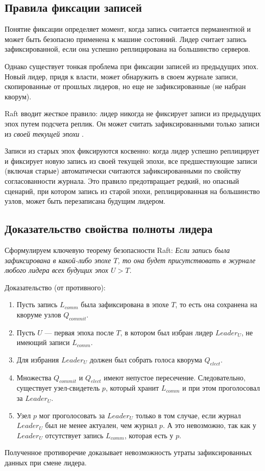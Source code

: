 \subsection{Правила фиксации записей}

Понятие фиксации определяет момент, когда запись считается перманентной и может быть безопасно применена к машине состояний. Лидер считает запись зафиксированной, если она успешно реплицирована на большинство серверов.

Однако существует тонкая проблема при фиксации записей из предыдущих эпох. Новый лидер, придя к власти, может обнаружить в своем журнале записи, скопированные от прошлых лидеров, но еще не зафиксированные (не набран кворум).

Raft вводит жесткое правило: лидер никогда не фиксирует записи из предыдущих эпох путем подсчета реплик. Он может считать зафиксированными только записи из \textit{своей текущей эпохи} \cite{raft_dissertation}.

Записи из старых эпох фиксируются косвенно: когда лидер успешно реплицирует и фиксирует новую запись из своей текущей эпохи, все предшествующие записи (включая старые) автоматически считаются зафиксированными по свойству согласованности журнала.
Это правило предотвращает редкий, но опасный сценарий, при котором запись из старой эпохи, реплицированная на большинство узлов, может быть перезаписана будущим лидером.

\subsection{Доказательство свойства полноты лидера}

Сформулируем ключевую теорему безопасности Raft:
\textit{Если запись была зафиксирована в какой-либо эпохе $T$, то она будет присутствовать в журнале любого лидера всех будущих эпох $U > T$.}

Доказательство (от противного):
\begin{enumerate}
    \item Пусть запись $L_{comm}$ была зафиксирована в эпохе $T$, то есть она сохранена на кворуме узлов $Q_{commit}$.
    \item Пусть $U$ — первая эпоха после $T$, в котором был избран лидер $Leader_U$, не имеющий записи $L_{comm}$.
    \item Для избрания $Leader_U$ должен был собрать голоса кворума $Q_{elect}$.
    \item Множества $Q_{commit}$ и $Q_{elect}$ имеют непустое пересечение. Следовательно, существует узел-свидетель $p$, который хранит $L_{comm}$ и при этом проголосовал за $Leader_U$.
    \item Узел $p$ мог проголосовать за $Leader_U$ только в том случае, если журнал $Leader_U$ был не менее актуален, чем журнал $p$. А это невозможно, так как у $Leader_U$ отсутствует запись $L_{comm}$, которая есть у $p$.
\end{enumerate}
Полученное противоречие доказывает невозможность утраты зафиксированных данных при смене лидера.
